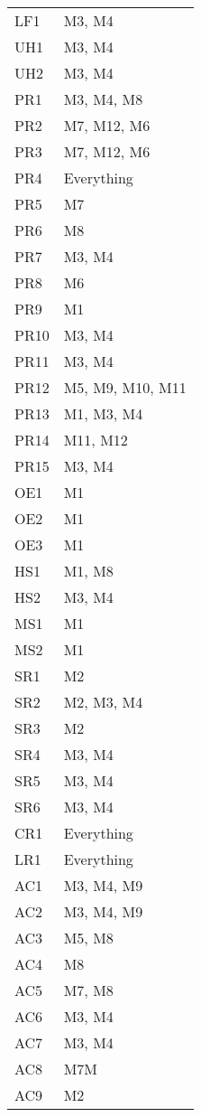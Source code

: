 \documentclass[12pt, titlepage]{article}
\begin{document}
\begin{longtable}{p{} p{}}
  LF1  & M3, M4 \\
UH1  & M3, M4 \\
UH2  & M3, M4 \\
PR1  & M3, M4, M8 \\
PR2  & M7, M12, M6 \\
PR3  & M7, M12, M6 \\
PR4  & Everything \\
PR5  & M7 \\
PR6  & M8 \\
PR7  & M3, M4 \\
PR8  & M6 \\
PR9  & M1 \\
PR10 & M3, M4 \\
PR11 & M3, M4 \\
PR12 & M5, M9, M10, M11 \\
PR13 & M1, M3, M4 \\
PR14 & M11, M12 \\
PR15 & M3, M4 \\
OE1  & M1 \\
OE2  & M1 \\
OE3  & M1 \\
HS1  & M1, M8 \\
HS2  & M3, M4 \\
MS1  & M1 \\
MS2  & M1 \\
SR1  & M2 \\
SR2  & M2, M3, M4 \\
SR3  & M2 \\
SR4  & M3, M4 \\
SR5  & M3, M4 \\
SR6  & M3, M4 \\
CR1  & Everything \\
LR1  & Everything \\
AC1  & M3, M4, M9 \\
AC2  & M3, M4, M9 \\
AC3  & M5, M8 \\
AC4  & M8 \\
AC5  & M7, M8 \\
AC6  & M3, M4 \\
AC7  & M3, M4 \\
AC8  & M7M \\
AC9  & M2 \\
  \end{longtable}
\end{document}
